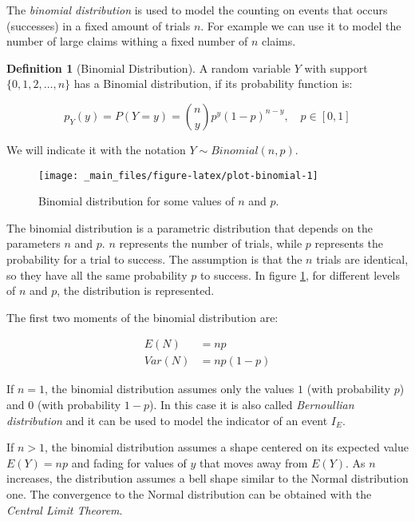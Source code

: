 \documentclass[a4paper, nobind]{templates/ociamthesis}
\theoremstyle{definition}
\newtheorem{definition}{Definition}[chapter]
\theoremstyle{definition}
\theoremstyle{definition}
\theoremstyle{remark}
\begin{document}
The \emph{binomial distribution} is used to model the counting on events that occurs (successes) in a fixed amount of trials \(n\). For example we can use it to model the number of large claims withing a fixed number of \(n\) claims.

\begin{definition}[Binomial Distribution]
\label{def:def-binomial} \iffalse (Binomial Distribution) \fi{} A random variable \(Y\) with support \(\{0,1,2, \dots, n \}\) has a Binomial distribution, if its probability function is:

\[
p_Y(y) = P\left( Y = y \right) = \binom{n}{y} p^y (1-p)^{n-y}, \quad p \in [0, 1]
\]

We will indicate it with the notation \(Y \sim Binomial(n, p)\).
\end{definition}

\begin{figure}[hbtp]

{\centering \texttt{[image: \_main\_files/figure-latex/plot-binomial-1]} 

}

\caption{Binomial distribution for some values of $n$ and $p$.}\label{fig:plot-binomial}
\end{figure}

The binomial distribution is a parametric distribution that depends on the parameters \(n\) and \(p\). \(n\) represents the number of trials, while \(p\) represents the probability for a trial to success. The assumption is that the \(n\) trials are identical, so they have all the same probability \(p\) to success. In figure \ref{fig:plot-binomial}, for different levels of \(n\) and \(p\), the distribution is represented.

The first two moments of the binomial distribution are:

\begin{align*}
E(N)   & = np \\
Var(N) & = np(1-p)
\end{align*}

If \(n = 1\), the binomial distribution assumes only the values \(1\) (with probability \(p\)) and \(0\) (with probability \(1-p\)). In this case it is also called \emph{Bernoullian distribution} and it can be used to model the indicator of an event \(I_E\).

If \(n>1\), the binomial distribution assumes a shape centered on its expected value \(E(Y)=np\) and fading for values of \(y\) that moves away from \(E(Y)\). As \(n\) increases, the distribution assumes a bell shape similar to the Normal distribution one. The convergence to the Normal distribution can be obtained with the \emph{Central Limit Theorem}.
\end{document}

